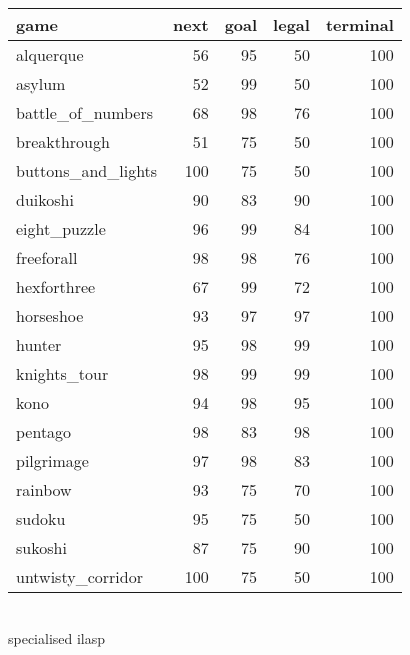 \documentclass[a4paper,12pt]{report}
\begin{document}
\begin{tabular}{lrrrr}
\hline
 game               &   next &   goal &   legal &   terminal \\
\hline
 alquerque          &     56 &     95 &      50 &        100 \\
 asylum             &     52 &     99 &      50 &        100 \\
 battle\_of\_numbers  &     68 &     98 &      76 &        100 \\
 breakthrough       &     51 &     75 &      50 &        100 \\
 buttons\_and\_lights &    100 &     75 &      50 &        100 \\
 duikoshi           &     90 &     83 &      90 &        100 \\
 eight\_puzzle       &     96 &     99 &      84 &        100 \\
 freeforall         &     98 &     98 &      76 &        100 \\
 hexforthree        &     67 &     99 &      72 &        100 \\
 horseshoe          &     93 &     97 &      97 &        100 \\
 hunter             &     95 &     98 &      99 &        100 \\
 knights\_tour       &     98 &     99 &      99 &        100 \\
 kono               &     94 &     98 &      95 &        100 \\
 pentago            &     98 &     83 &      98 &        100 \\
 pilgrimage         &     97 &     98 &      83 &        100 \\
 rainbow            &     93 &     75 &      70 &        100 \\
 sudoku             &     95 &     75 &      50 &        100 \\
 sukoshi            &     87 &     75 &      90 &        100 \\
 untwisty\_corridor  &    100 &     75 &      50 &        100 \\
\hline
\end{tabular}
\\
specialised ilasp
\\
\end{document}
